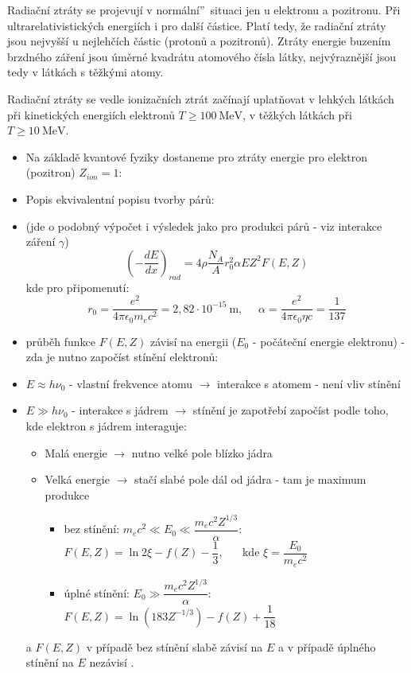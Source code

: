 \documentclass[../../main.tex]{subfiles}
\begin{document}
Radiační ztráty se projevují v \quotedblbase normální\textquotedblright ~situaci jen u elektronu a pozitronu. Při ultrarelativistických energiích i pro další částice. Platí tedy, že radiační ztráty jsou nejvyšší u nejlehčích částic (protonů a pozitronů). Ztráty energie buzením brzdného záření jsou úměrné kvadrátu atomového čísla látky, nejvýraznější jsou tedy v látkách s těžkými atomy.

Radiační ztráty se vedle ionizačních ztrát začínají uplatňovat v lehkých látkách při kinetických energiích elektronů $T \geq 100 ~\mathrm{MeV}$, v těžkých látkách při $T \geq 10 ~\mathrm{MeV}$.

\begin{itemize}
	\item Na základě kvantové fyziky dostaneme pro ztráty energie pro elektron (pozitron) $Z_{ion} = 1$:
	\item Popis ekvivalentní popisu tvorby párů:
	\item (jde o podobný výpočet i výsledek jako pro produkci párů - viz interakce záření $\gamma$)
	\begin{equation}
	\left( - \dfrac{dE}{dx}\right) _{rad} = 4 \rho \dfrac{N_A}{A} r_{0}^2 \alpha E Z^2 F(E,Z) 
	\end{equation}
	kde pro připomenutí:
	\begin{equation}
	r_0 = \dfrac{e^2}{4 \pi \epsilon_0 m_e c^2} = 2,82 \cdotp 10^{-15} ~\mathrm{m}, ~~ ~~~~ \alpha = \dfrac{e^2}{4 \pi \epsilon_0 \eta c} = \dfrac{1}{137} 
	\end{equation}
	\item průběh funkce $F(E,Z)$ závisí na energii ($E_0$ - počáteční energie elektronu) - zda je nutno započíst stínění elektronů:
	\item $E \approx h \nu_0$ - vlastní frekvence atomu $\rightarrow$ interakce s atomem - není vliv stínění
	\item $E \gg h \nu_0$ - interakce s jádrem $\rightarrow$ stínění je zapotřebí započíst podle toho, kde elektron s jádrem interaguje:
	\begin{itemize}
		\item Malá energie $\rightarrow$ nutno velké pole blízko jádra
		\item Velká energie $\rightarrow$ stačí slabé pole dál od jádra - tam je maximum produkce
		\begin{itemize}
			\item bez stínění: $m_e c^2 \ll E_0 \ll \dfrac{m_e c^2 Z^{1/3}}{\alpha}$: ~~~$F(E,Z) = \ln 2 \xi - f(Z) - \dfrac{1}{3}$,~~~ kde $\xi = \dfrac{E_0}{m_e c^2}$
			\item úplné stínění: $E_0 \gg \dfrac{m_e c^2 Z^{1/3}}{\alpha}$: ~~~$F(E,Z) = \ln(183 Z^{-1/3})- f(Z) + \dfrac{1}{18}$
		\end{itemize}	
    \end{itemize}
  a $F(E,Z)$ v případě bez stínění slabě závisí na $E$ a v případě úplného stínění na $E$ nezávisí . 	
\end{itemize}
 
\end{document}
